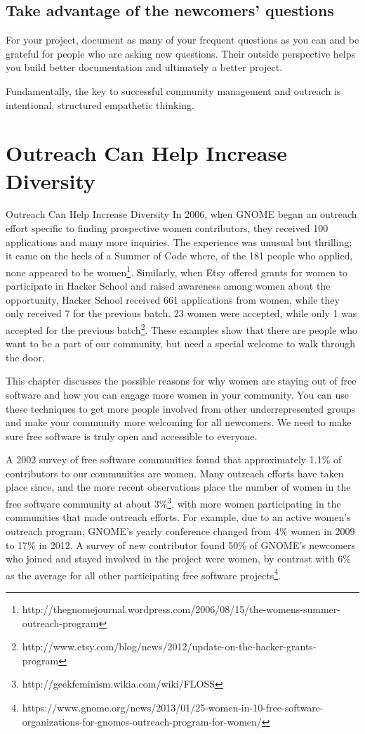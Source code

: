 \subsection{Take advantage of the newcomers’ questions}
For your project, document as many of your frequent questions as you can and be grateful for people who are asking new questions. Their outside perspective helps you build better documentation and ultimately a better project. 

Fundamentally, the key to successful community management and outreach is intentional, structured empathetic thinking.

\section{Outreach Can Help Increase Diversity}
Outreach Can Help Increase Diversity
In 2006, when GNOME began an outreach effort specific to finding prospective women contributors, they received 100 applications and many more inquiries. The experience was unusual but thrilling; it came on the heels of a Summer of Code where, of the 181 people who applied, none appeared to be women\footnote{http://thegnomejournal.wordpress.com/2006/08/15/the-womens-summer-outreach-program}. Similarly, when Etsy offered grants for women to participate in Hacker School and raised awareness among women about the opportunity, Hacker School received 661 applications from women, while they only received 7 for the previous batch. 23 women were accepted, while only 1 was accepted for the previous batch\footnote{http://www.etsy.com/blog/news/2012/update-on-the-hacker-grants-program}. These examples show that there are people who want to be a part of our community, but need a special welcome to walk through the door.

This chapter discusses the possible reasons for why women are staying out of free software and how you can engage more women in your community. You can use these techniques to get more people involved from other underrepresented groups and make your community more welcoming for all newcomers. We need to make sure free software is truly open and accessible to everyone.

A 2002 survey of free software communities found that approximately 1.1\% of contributors to our communities are women. Many outreach efforts have taken place since, and the more recent observations place the number of women in the free software community at about 3\%\footnote{http://geekfeminism.wikia.com/wiki/FLOSS}, with more women participating in the communities that made outreach efforts. For example, due to an active women’s outreach program, GNOME’s yearly conference changed from 4\% women in 2009 to 17\% in 2012. A survey of new contributor found 50\% of GNOME’s newcomers who joined and stayed involved in the project were women, by contrast with 6\% as the average for all other participating free software projects\footnote{https://www.gnome.org/news/2013/01/25-women-in-10-free-software-organizations-for-gnomes-outreach-program-for-women/}.


